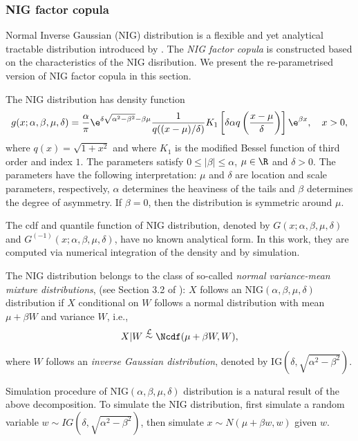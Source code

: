 \subsubsection{NIG factor copula}

Normal Inverse Gaussian (NIG) distribution is a flexible and yet analytical tractable distribution introduced by
\citep{BarndorffNielsen1997}.
The {\em NIG factor copula} is constructed based on the characteristics of the NIG disribution. 
We present the re-parametrised version of NIG factor copula in this section.

The NIG distribution has density function
\begin{equation*}
  g(x; \alpha,\beta, \mu, \delta) = \frac{\alpha}{\pi} \e^{\delta
    \sqrt{\alpha^2-\beta^2} -\beta\mu} \frac{1}{q((x-\mu)/\delta)}
  K_1\left[\delta \alpha q\left(\frac{x-\mu}{\delta}\right) \right]
  \e^{\beta x},\quad x>0,
\end{equation*}
where $q(x) = \sqrt{1+x^2}$ and where $K_1$ is the modified Bessel
function of third order and index $1$. The parameters satisfy $0\leq
|\beta|\leq \alpha$, $\mu\in \R$ and $\delta>0$. The parameters have
the following interpretation: $\mu$ and $\delta$ are location and
scale parameters, respectively, $\alpha$ determines the heaviness of
the tails and $\beta$ determines the degree of asymmetry. If
$\beta=0$, then the distribution is symmetric around $\mu$.

The cdf and quantile function of NIG distribution, denoted by $G(x; \alpha, \beta, \mu, \delta)$ and $G^{(-1)}(x; \alpha, \beta, \mu, \delta)$,
 have no known analytical form.
 In this work, they are computed via numerical integration of the density and by simulation.

The NIG distribution belongs to
the class of so-called {\em normal
variance-mean mixture distributions},  (see Section 3.2 of 
\citet{McNeil2005}): $X$ follows an
$\text{NIG}(\alpha,\beta,\mu,\delta)$ distribution if $X$ conditional
on $W$ follows a normal distribution with mean $\mu+\beta W$ and
variance $W$, i.e., 
\begin{equation*}
  X|W\stackrel{\mathcal L}\sim \Ncdf(\mu + \beta W, W),
\end{equation*}
where $W$ follows an {\em inverse Gaussian distribution}, denoted by
$\text{IG}(\delta, \sqrt{\alpha^2-\beta^2})$.

Simulation procedure of NIG$(\alpha, \beta, \mu, \delta)$ distribution is a natural result of the above decomposition. 
To simulate the NIG distribution, first simulate a random variable $w \sim IG(\delta, \sqrt{\alpha^2-\beta^2})$, 
then simulate $x \sim N(\mu+ \beta w, w)$ given $w$.

